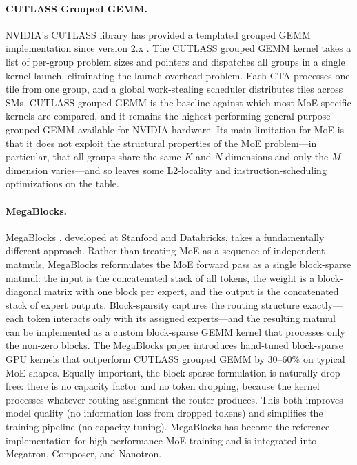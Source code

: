 \documentclass[10pt]{article}
\begin{document}
\paragraph{CUTLASS Grouped GEMM.}
NVIDIA's CUTLASS library has provided a templated grouped GEMM implementation since version 2.x \citep{thakkar2023cutlass}. The CUTLASS grouped GEMM kernel takes a list of per-group problem sizes and pointers and dispatches all groups in a single kernel launch, eliminating the launch-overhead problem. Each CTA processes one tile from one group, and a global work-stealing scheduler distributes tiles across SMs. CUTLASS grouped GEMM is the baseline against which most MoE-specific kernels are compared, and it remains the highest-performing general-purpose grouped GEMM available for NVIDIA hardware. Its main limitation for MoE is that it does not exploit the structural properties of the MoE problem---in particular, that all groups share the same $K$ and $N$ dimensions and only the $M$ dimension varies---and so leaves some L2-locality and instruction-scheduling optimizations on the table.

\paragraph{MegaBlocks.}
MegaBlocks \citep{gale2023megablocks}, developed at Stanford and Databricks, takes a fundamentally different approach. Rather than treating MoE as a sequence of independent matmuls, MegaBlocks reformulates the MoE forward pass as a single block-sparse matmul: the input is the concatenated stack of all tokens, the weight is a block-diagonal matrix with one block per expert, and the output is the concatenated stack of expert outputs. Block-sparsity captures the routing structure exactly---each token interacts only with its assigned experts---and the resulting matmul can be implemented as a custom block-sparse GEMM kernel that processes only the non-zero blocks. The MegaBlocks paper introduces hand-tuned block-sparse GPU kernels that outperform CUTLASS grouped GEMM by 30--60\% on typical MoE shapes. Equally important, the block-sparse formulation is naturally drop-free: there is no capacity factor and no token dropping, because the kernel processes whatever routing assignment the router produces. This both improves model quality (no information loss from dropped tokens) and simplifies the training pipeline (no capacity tuning). MegaBlocks has become the reference implementation for high-performance MoE training and is integrated into Megatron, Composer, and Nanotron.
\end{document}
